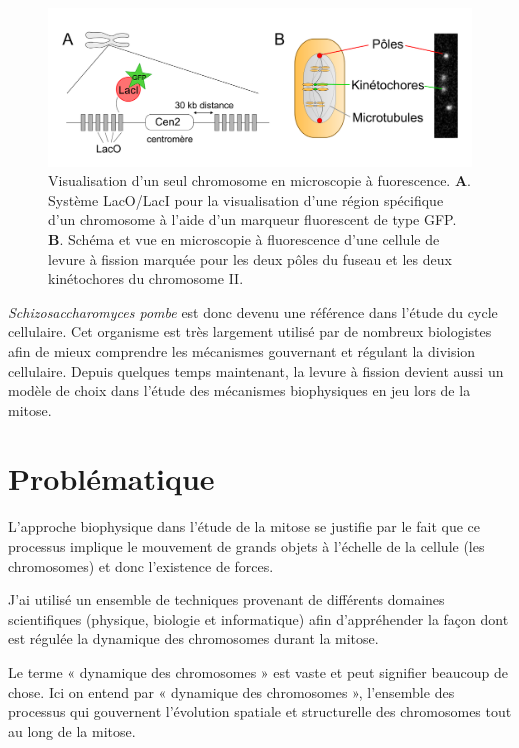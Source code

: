 \documentclass[12pt,a4paper,twoside,openright]{book}
\begin{document}
\begin{figure}[htbp]
\centering
\includegraphics{figures/intro/lac.png}
\caption[Visualisation d'un seul chromosome en microscopie à fuorescence]{\label{fig:lac}Visualisation
d'un seul chromosome en microscopie à fuorescence. \textbf{A}. Système
LacO/LacI pour la visualisation d'une région spécifique d'un chromosome
à l'aide d'un marqueur fluorescent de type GFP. \textbf{B}. Schéma et
vue en microscopie à fluorescence d'une cellule de levure à fission
marquée pour les deux pôles du fuseau et les deux kinétochores du
chromosome II.}
\end{figure}

\emph{Schizosaccharomyces pombe} est donc devenu une référence dans
l'étude du cycle cellulaire. Cet organisme est très largement utilisé
par de nombreux biologistes afin de mieux comprendre les mécanismes
gouvernant et régulant la division cellulaire. Depuis quelques temps
maintenant, la levure à fission devient aussi un modèle de choix dans
l'étude des mécanismes biophysiques en jeu lors de la mitose.

\section{Problématique}\label{probluxe9matique}

L'approche biophysique dans l'étude de la mitose se justifie par le fait
que ce processus implique le mouvement de grands objets à l'échelle de
la cellule (les chromosomes) et donc l'existence de forces.

J'ai utilisé un ensemble de techniques provenant de différents domaines
scientifiques (physique, biologie et informatique) afin d'appréhender la
façon dont est régulée la dynamique des chromosomes durant la mitose.

Le terme « dynamique des chromosomes » est vaste et peut signifier
beaucoup de chose. Ici on entend par « dynamique des chromosomes »,
l'ensemble des processus qui gouvernent l'évolution spatiale et
structurelle des chromosomes tout au long de la mitose.
\end{document}
